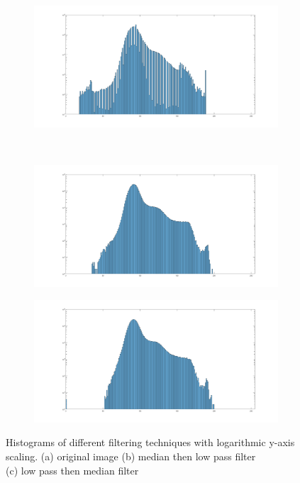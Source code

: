 \documentclass{article}
\begin{document}
\begin{figure}[H]
	\centering
	\begin{subfigure}[b]{0.45\textwidth}
		\includegraphics[width=\linewidth]{original_histo}
		\caption{}
		\label{fig:origNoFiltHist2}
	\end{subfigure} 
	\\
	\begin{subfigure}[b]{0.45\textwidth}
		\includegraphics[width=\linewidth]{both_inverse_histo}
		\caption{}
		\label{fig:MedianLowPassFiltHist}
	\end{subfigure}
	\hspace{\fill}
	\begin{subfigure}[b]{0.45\textwidth}
		\includegraphics[width=\linewidth]{both_right_histo}
		\caption{}
		\label{fig:LowPassMedianFiltHist}
	\end{subfigure}
	\captionsetup{justification=centering}
	\caption{Histograms of different filtering techniques with logarithmic y-axis scaling.
		(a) original image
		(b) median then low pass filter \\
		(c) low pass then median filter}
	\label{fig:lowpassHisto2}
\end{figure}
\end{document}
